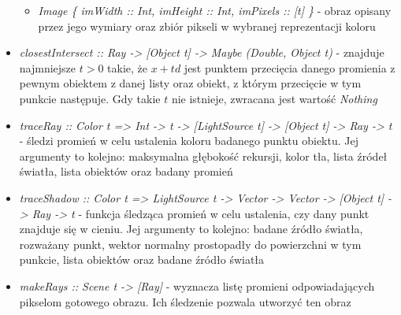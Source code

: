 \documentclass[11pt,a4paper]{article}
\begin{document}
\begin{itemize}
\begin{itemize}
\item\textit{Image \{
    imWidth :: Int,
    imHeight :: Int,
    imPixels :: [t]
\}} - obraz opisany przez jego wymiary oraz zbiór pikseli w wybranej reprezentacji koloru
\end{itemize}
\item\textit{closestIntersect :: Ray -> [Object t] -> Maybe (Double, Object t)} - znajduje najmniejsze $t > 0$ takie, że $x + td$ jest punktem przecięcia danego promienia z pewnym obiektem z danej listy oraz obiekt, z którym przecięcie w tym punkcie następuje. Gdy takie $t$ nie istnieje, zwracana jest wartość \textit{Nothing}
\item\textit{traceRay :: Color t => Int -> t -> [LightSource t] -> [Object t] -> Ray -> t} - śledzi promień w celu ustalenia koloru badanego punktu obiektu. Jej argumenty to kolejno: maksymalna głębokość rekursji, kolor tła, lista źródeł światła, lista obiektów oraz badany promień
\item\textit{traceShadow :: Color t => LightSource t -> Vector -> Vector -> [Object t] -> Ray -> t} - funkcja śledząca promień w celu ustalenia, czy dany punkt znajduje się w cieniu. Jej argumenty to kolejno: badane źródło światła, rozważany punkt, wektor normalny prostopadły do powierzchni w tym punkcie, lista obiektów oraz badane źródło światła
\item\textit{makeRays :: Scene t -> [Ray]} - wyznacza listę promieni odpowiadających pikselom gotowego obrazu. Ich śledzenie pozwala utworzyć ten obraz
\end{itemize}
\end{document}
